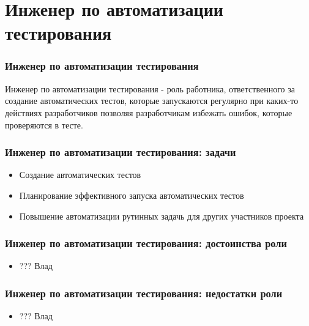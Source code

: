 \documentclass{../industrial-development}
\begin{document}
\section{Инженер по автоматизации тестирования}

\begin{frame} \frametitle{Инженер по автоматизации тестирования}
	\begin{block}{}
		\alert {Инженер по автоматизации тестирования} - роль работника, ответственного за создание автоматических тестов, которые запускаются регулярно при каких-то действиях разработчиков позволяя разработчикам избежать ошибок, которые проверяются в тесте.
	\end{block}
	
\end{frame}

\begin{frame} \frametitle{Инженер по автоматизации тестирования: задачи}
	\begin{block}{}
	\begin{itemize}
		\item Создание автоматических тестов
		\item Планирование эффективного запуска автоматических тестов
		\item Повышение автоматизации рутинных задачь для других участников проекта		
	\end{itemize}
	\end{block}
	
\end{frame}

\begin{frame} \frametitle{Инженер по автоматизации тестирования: достоинства роли}
	\begin{block}{}
		\begin{itemize}
			\item ??? Влад
		\end{itemize}
	\end{block}
	
\end{frame}

\begin{frame} \frametitle{Инженер по автоматизации тестирования: недостатки роли}
	\begin{block}{}
		\begin{itemize}
			\item ??? Влад
		\end{itemize}
	\end{block}
	
\end{frame}
\end{document}
